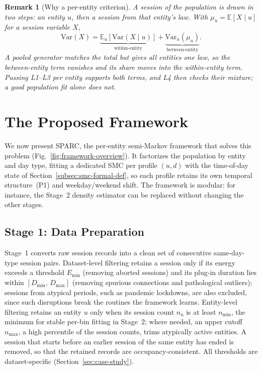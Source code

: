 \documentclass[journal]{IEEEtran}
\newtheorem{remark}{Remark}
\begin{document}
\begin{remark}[Why a per-entity criterion]
\label{rem:per-entity-criterion}
A session of the population is drawn in two steps: an entity $u$, then a session from that entity's law. With $\mu_u = \mathbb{E}[X \mid u]$ for a session variable $X$,
\begin{equation}
    \mathrm{Var}(X) =
    \underbrace{\mathbb{E}_u\!\left[\mathrm{Var}(X \mid u)\right]}_{\text{within-entity}}
    + \underbrace{\mathrm{Var}_u\!\left(\mu_u\right)}_{\text{between-entity}}.
    \label{eq:total-variance}
\end{equation}
A pooled generator matches the total but gives all entities one law, so the between-entity term vanishes and its share moves into the within-entity term. Passing L1--L3 per entity supports both terms, and L4 then checks their mixture; a good population fit alone does not.
\end{remark}

\section{The Proposed Framework}
\label{sec:framework}

We now present SPARC, the per-entity semi-Markov framework that solves this problem (Fig.~\ref{fig:framework-overview}). It factorizes the population by entity and day type, fitting a dedicated SMC per profile $(u,d)$ with the time-of-day state of Section~\ref{subsec:smc-formal-def}, so each profile retains its own temporal structure~(P1) and weekday/weekend shift. The framework is modular: for instance, the Stage~2 density estimator can be replaced without changing the other stages.

\subsection{Stage 1: Data Preparation}
\label{subsec:stage1}

Stage~1 converts raw session records into a clean set of consecutive same-day-type session pairs. Dataset-level filtering retains a session only if its energy exceeds a threshold $E_{\min}$ (removing aborted sessions) and its plug-in duration lies within $[D_{\min},\, D_{\max}]$ (removing spurious connections and pathological outliers); sessions from atypical periods, such as pandemic lockdowns, are also excluded, since such disruptions break the routines the framework learns. Entity-level filtering retains an entity $u$ only when its session count $n_u$ is at least $n_{\min}$, the minimum for stable per-bin fitting in Stage~2; where needed, an upper cutoff $n_{\max}$, a high percentile of the session counts, trims atypically active entities. A session that starts before an earlier session of the same entity has ended is removed, so that the retained records are occupancy-consistent. All thresholds are dataset-specific (Section~\ref{sec:case-study}).
\end{document}
